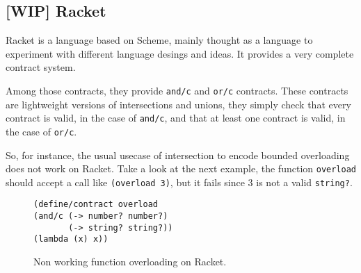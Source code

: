 \documentclass[sigplan,10pt,review,anonymous]{acmart}
\newcommand{\unsure}[2][1=]{}
\newcommand{\racket}[1]{\lstinline[language=racket]{#1}}
\begin{document}




\unsure{Is it worth mentioning how continuations are formed?
Should we go so techincal?}

\subsection*{[WIP] Racket}
\label{sec:racket}


Racket is a language based on Scheme, mainly thought as a language to experiment
with different language desings and ideas. It provides a very complete contract
system\cite{RacketContracts}.

Among those contracts, they provide \racket{and/c} and \racket{or/c} contracts.
These contracts are lightweight versions of intersections and unions, they simply
check that every contract is valid, in the case of \racket{and/c},
and that at least one contract
is valid, in the case of \racket{or/c}.

So, for instance, the usual usecase of intersection to encode bounded overloading
does not work on Racket. Take a look at the next example, the function
\racket{overload} should accept a call like \racket{(overload 3)}, but it fails
since 3 is not a valid \racket{string?}.

\begin{figure}[h]

\begin{lstlisting}[language=racket]
(define/contract overload
(and/c (-> number? number?)
       (-> string? string?))
(lambda (x) x))
\end{lstlisting}
\caption{Non working function overloading on Racket.}

\end{figure}
\end{document}
